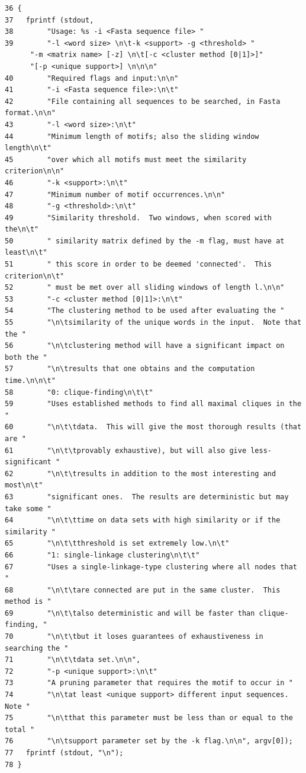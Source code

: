\scriptsize\begin{verbatim}36 {
37   fprintf (stdout,
38        "Usage: %s -i <Fasta sequence file> "
39        "-l <word size> \n\t-k <support> -g <threshold> "
	  "-m <matrix name> [-z] \n\t[-c <cluster method [0|1]>]"
	  "[-p <unique support>] \n\n\n"
40        "Required flags and input:\n\n"
41        "-i <Fasta sequence file>:\n\t"
42        "File containing all sequences to be searched, in Fasta format.\n\n"
43        "-l <word size>:\n\t"
44        "Minimum length of motifs; also the sliding window length\n\t"
45        "over which all motifs must meet the similarity criterion\n\n"
46        "-k <support>:\n\t"
47        "Minimum number of motif occurrences.\n\n"
48        "-g <threshold>:\n\t"
49        "Similarity threshold.  Two windows, when scored with the\n\t"
50        " similarity matrix defined by the -m flag, must have at least\n\t"
51        " this score in order to be deemed 'connected'.  This criterion\n\t"
52        " must be met over all sliding windows of length l.\n\n"
53        "-c <cluster method [0|1]>:\n\t"
54        "The clustering method to be used after evaluating the "
55        "\n\tsimilarity of the unique words in the input.  Note that the "
56        "\n\tclustering method will have a significant impact on both the "
57        "\n\tresults that one obtains and the computation time.\n\n\t"
58        "0: clique-finding\n\t\t"
59        "Uses established methods to find all maximal cliques in the "
60        "\n\t\tdata.  This will give the most thorough results (that are "
61        "\n\t\tprovably exhaustive), but will also give less-significant "
62        "\n\t\tresults in addition to the most interesting and most\n\t"
63        "significant ones.  The results are deterministic but may take some "
64        "\n\t\ttime on data sets with high similarity or if the similarity "
65        "\n\t\tthreshold is set extremely low.\n\t"
66        "1: single-linkage clustering\n\t\t"
67        "Uses a single-linkage-type clustering where all nodes that "
68        "\n\t\tare connected are put in the same cluster.  This method is "
69        "\n\t\talso deterministic and will be faster than clique-finding, "
70        "\n\t\tbut it loses guarantees of exhaustiveness in searching the "
71        "\n\t\tdata set.\n\n",
72        "-p <unique support>:\n\t"
73        "A pruning parameter that requires the motif to occur in "
74        "\n\tat least <unique support> different input sequences.  Note "
75        "\n\tthat this parameter must be less than or equal to the total "
76        "\n\tsupport parameter set by the -k flag.\n\n", argv[0]);
77   fprintf (stdout, "\n");
78 }
\end{verbatim}
\normalsize 


